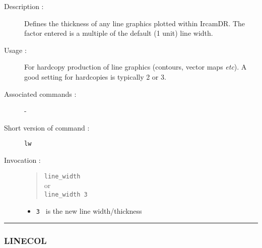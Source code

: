 \begin{description}

\item[Description :] Defines the thickness of any line graphics plotted
within {\sc IrcamDR}.  The factor entered is a multiple of the default
(1 unit) line width.

\item[Usage :] For hardcopy production of line graphics (contours,
vector maps \emph{etc}).  A good setting for hardcopies is typically 2
or 3.

\item[Associated commands :] -
\item[Short version of command :] {\tt lw}
\item[Invocation :]

\begin{quote}{\tt  line\_width }\\
or \\
{\tt line\_width 3 }
\end{quote}

\begin{itemize}

\item {\tt 3 } is the new line width/thickness

\end{itemize}

\end{description}

\hrule
\subsubsection*{\label{LINECOL}LINECOL}

